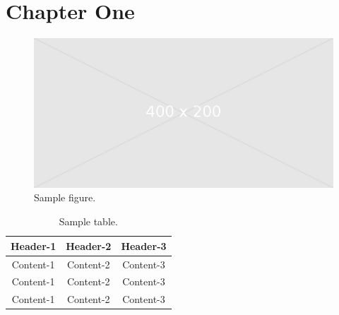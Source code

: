 \chapter{Chapter One}
\label{ch:chapter-one}
\lipsum[1-3]\cite{DUMMY:1}
\begin{figure}	
	\centering
	\includegraphics[width=\textwidth]{img/placeholder400x200}
	\caption{Sample figure.}
	\label{fig:sample-figure}
\end{figure}

\lipsum[1-3]\cite{DUMMY:2}

\begin{table}
	\centering
	\begin{tabular}{|c|c|c|}
		\hline
		Header-1 & Header-2 & Header-3 \\
		\hline\hline
		Content-1 & Content-2 & Content-3 \\
		\hline
		Content-1 & Content-2 & Content-3 \\
		\hline
		Content-1 & Content-2 & Content-3 \\
		\hline		
	\end{tabular}
	\caption{Sample table.}
	\label{tab:sample-table}
\end{table}

\lipsum[1-3]\cite{DUMMY:2}



\lipsum[1-3]\cite{DUMMY:3}




